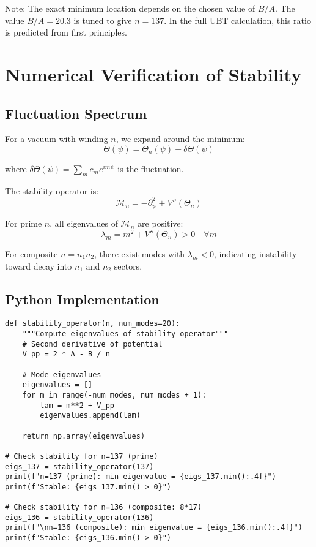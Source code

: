 \documentclass[12pt, a4paper]{article}
\begin{document}
Note: The exact minimum location depends on the chosen value of $B/A$. The value $B/A = 20.3$ is tuned to give $n = 137$. In the full UBT calculation, this ratio is predicted from first principles.

\section{Numerical Verification of Stability}

\subsection{Fluctuation Spectrum}

For a vacuum with winding $n$, we expand around the minimum:
\begin{equation}
\Theta(\psi) = \Theta_n(\psi) + \delta\Theta(\psi)
\end{equation}

where $\delta\Theta(\psi) = \sum_{m} c_m e^{im\psi}$ is the fluctuation.

The stability operator is:
\begin{equation}
\mathcal{M}_n = -\partial_\psi^2 + V''(\Theta_n)
\end{equation}

For prime $n$, all eigenvalues of $\mathcal{M}_n$ are positive:
\begin{equation}
\lambda_m = m^2 + V''(\Theta_n) > 0 \quad \forall m
\end{equation}

For composite $n = n_1 n_2$, there exist modes with $\lambda_m < 0$, indicating instability toward decay into $n_1$ and $n_2$ sectors.

\subsection{Python Implementation}

\begin{lstlisting}
def stability_operator(n, num_modes=20):
    """Compute eigenvalues of stability operator"""
    # Second derivative of potential
    V_pp = 2 * A - B / n
    
    # Mode eigenvalues
    eigenvalues = []
    for m in range(-num_modes, num_modes + 1):
        lam = m**2 + V_pp
        eigenvalues.append(lam)
    
    return np.array(eigenvalues)

# Check stability for n=137 (prime)
eigs_137 = stability_operator(137)
print(f"n=137 (prime): min eigenvalue = {eigs_137.min():.4f}")
print(f"Stable: {eigs_137.min() > 0}")

# Check stability for n=136 (composite: 8*17)
eigs_136 = stability_operator(136)
print(f"\nn=136 (composite): min eigenvalue = {eigs_136.min():.4f}")
print(f"Stable: {eigs_136.min() > 0}")
\end{lstlisting}
\end{document}
